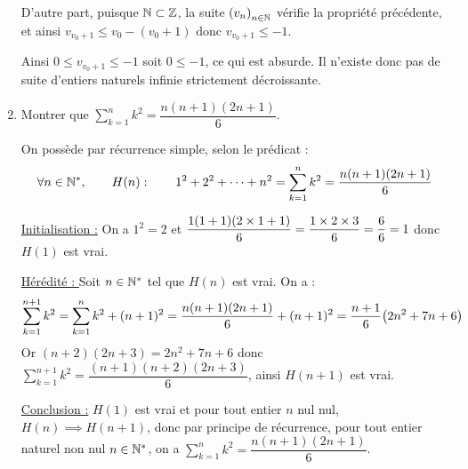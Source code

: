 \documentclass[a4paper,french,bookmarks]{book}
\begin{document}
\begin{enumerate}
{\begin{enumerate}
            \itt D'autre part, puisque $\mathbb{N} \subset \mathbb{Z}$, la suite ${\left(v_n\right)_{n \in \mathbb{N}}}$ vérifie la propriété précédente, et ainsi $v_{v_0 + 1} \leq v_0 - (v_0 + 1)$ donc $v_{v_0 + 1} \leq -1$.
        \end{enumerate}
        Ainsi $0 \leq v_{v_0 + 1} \leq -1$ soit $0 \leq -1$, ce qui est absurde. Il n'existe donc pas de suite d'entiers naturels infinie strictement décroissante.
         
    }
    \yesbefore
    
    \item Montrer que $\displaystyle\sum_{k = 1}^n k^2 = \dfrac{n(n+1)(2n + 1)}{6}$.
    
    \noafter
    \nobefore
    \yesafter
    \begin{nproof}
        On possède par récurrence simple, selon le prédicat :
            \[ \forall n \in \mathbb{N}^*,\qquad H\!\left(n\right) : \qquad 1^2 + 2^2 + \dots + n^2 = \displaystyle\sum_{k = 1}^n k^2 = \dfrac{n(n+1)(2n + 1)}{6}\]
            \begin{enumerate}
                \itt \underline{Initialisation :} On a $1^2 = 2$ et $\dfrac{1\!\left(1 + 1\right)\!\left(2\times 1 + 1\right)}{6} = \dfrac{1\times2\times3}{6} = \dfrac{6}{6} = 1$ donc $H(1)$ est vrai.
                
                \itt \underline{Hérédité : } Soit $n \in \mathbb{N}^*$ tel que $H(n)$ est vrai. On a :
                \begin{align*}
                     \sum_{k=1}^{n+1} k^2 = \sum_{k=1}^n k^2 + (n+1)^2 = \dfrac{n(n+1)(2n+1)}{6} + (n+1)^2 = \dfrac{n+1}{6}\!\left(2n^2 + 7n + 6\right)
                \end{align*}
                Or $(n+2)(2n+3) = 2n^2 + 7n + 6$ donc $\displaystyle \sum_{k=1}^{n+1} k^2 = \dfrac{(n+1)(n+2)(2n+3)}{6}$, ainsi $H(n+1)$ est vrai.
                
                \itt \underline{Conclusion :} $H(1)$ est vrai et pour tout entier $n$ nul nul, $H(n) \implies H(n+1)$, donc par principe de récurrence, pour tout entier naturel non nul $n \in \mathbb{N}^*$, on a $\displaystyle\sum_{k = 1}^n k^2 = \dfrac{n(n+1)(2n + 1)}{6}$.
            \end{enumerate}
    \end{nproof}
    \yesbefore
    

\end{enumerate}
\end{document}
